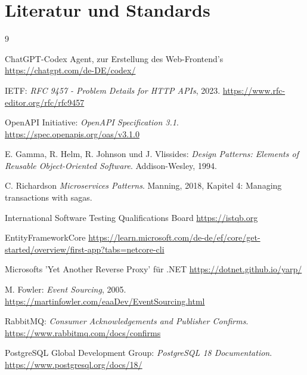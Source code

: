 \documentclass[10pt,a4paper]{article}
\newcommand{\midGap}{\vspace{12mm}}
\begin{document}
\midGap

\newpage

\section*{Literatur und Standards}
\small
\begin{thebibliography}{9}

ChatGPT-Codex Agent, zur Erstellung des Web-Frontend's
\url{https://chatgpt.com/de-DE/codex/}

IETF:
\emph{RFC 9457 - Problem Details for HTTP APIs}, 2023.
\url{https://www.rfc-editor.org/rfc/rfc9457}

OpenAPI Initiative:
\emph{OpenAPI Specification 3.1}.
\url{https://spec.openapis.org/oas/v3.1.0}

E. Gamma, R. Helm, R. Johnson und J. Vlissides:
\emph{Design Patterns: Elements of Reusable Object-Oriented Software}.
Addison-Wesley, 1994.

C. Richardson
\emph{Microservices Patterns}. Manning, 2018,
Kapitel 4: Managing transactions with sagas.

 International Software Testing Qualifications Board
\url{https://istqb.org}

EntityFrameworkCore
\url{https://learn.microsoft.com/de-de/ef/core/get-started/overview/first-app?tabs=netcore-cli}

Microsofts 'Yet Another Reverse Proxy' für .NET
\url{https://dotnet.github.io/yarp/}

M. Fowler:
\emph{Event Sourcing}, 2005.
\url{https://martinfowler.com/eaaDev/EventSourcing.html}

RabbitMQ:
\emph{Consumer Acknowledgements and Publisher Confirms}.
\url{https://www.rabbitmq.com/docs/confirms}

PostgreSQL Global Development Group:
\emph{PostgreSQL 18 Documentation}.
\url{https://www.postgresql.org/docs/18/}

\end{thebibliography}
\end{document}
